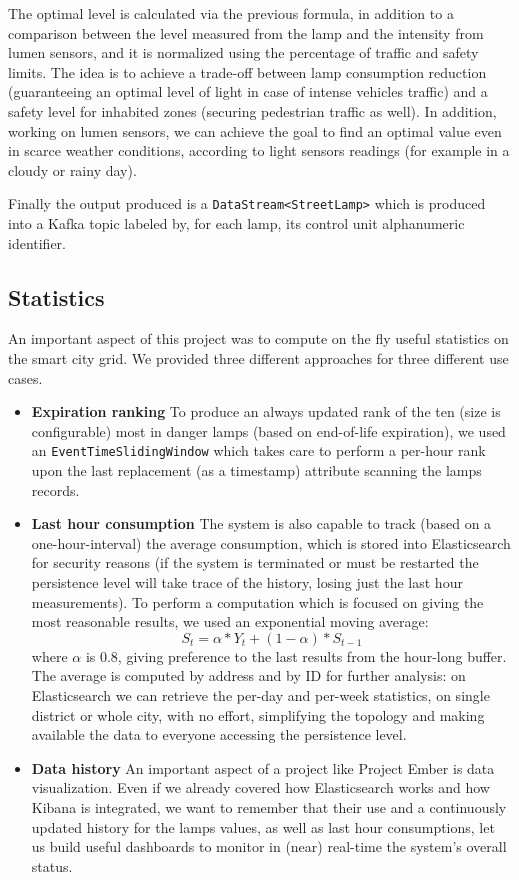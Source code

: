 	The optimal level is calculated via the previous formula, in addition to a comparison between the level measured from the lamp and the intensity from lumen sensors, and it is normalized using the percentage of traffic and safety limits. The idea is to achieve a trade-off between lamp consumption reduction (guaranteeing an optimal level of light in case of intense vehicles traffic) and a safety level for inhabited zones (securing pedestrian traffic as well). In addition, working on lumen sensors, we can achieve the goal to find an optimal value even in scarce weather conditions, according to light sensors readings (for example in a cloudy or rainy day).

Finally the output produced is a \texttt{DataStream<StreetLamp>} which is produced into a Kafka topic labeled by, for each lamp, its control unit alphanumeric identifier.

\subsection*{Statistics}
An important aspect of this project was to compute on the fly useful statistics on the smart city grid. We provided three different approaches for three different use cases.
\begin{itemize}
	\item \textbf{Expiration ranking} To produce an always updated rank of the ten (size is configurable) most in danger lamps (based on end-of-life expiration), we used an \texttt{EventTimeSlidingWindow} which takes care to perform a per-hour rank upon the last replacement (as a timestamp) attribute scanning the lamps records.
	\item \textbf{Last hour consumption} The system is also capable to track (based on a one-hour-interval) the average consumption, which is stored into Elasticsearch for security reasons (if the system is terminated or must be restarted the persistence level will take trace of the history, losing just the last hour measurements). To perform a computation which is focused on giving the most reasonable results, we used an exponential moving average:
$$S_t = \alpha*Y_t + (1 - \alpha)*S_{t-1}$$
where $\alpha$ is 0.8, giving preference to the last results from the hour-long buffer. The average is computed by address and by ID for further analysis: on Elasticsearch we can retrieve the per-day and per-week statistics, on single district or whole city, with no effort, simplifying the topology and making available the data to everyone accessing the persistence level.
	\item \textbf{Data history} An important aspect of a project like Project Ember is data visualization. Even if we already covered how Elasticsearch works and how Kibana is integrated, we want to remember that their use and a continuously updated history for the lamps values, as well as last hour consumptions, let us build useful dashboards to monitor in (near) real-time the system's overall status.
\end{itemize}

